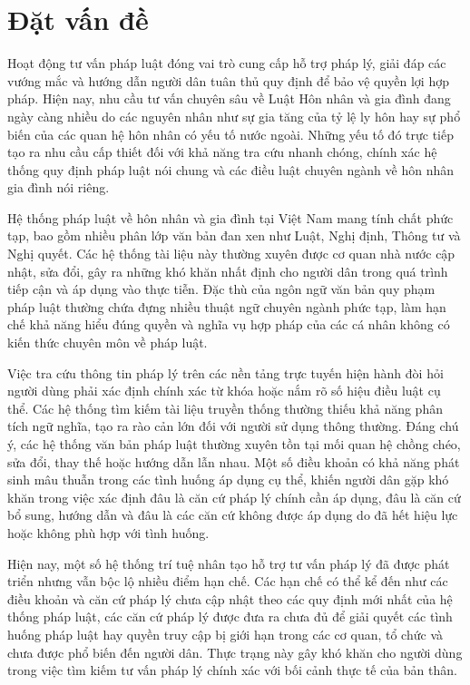 \documentclass[../DoAn.tex]{subfiles}
\begin{document}
\section{Đặt vấn đề}
\label{section:1.1}

Hoạt động tư vấn pháp luật đóng vai trò cung cấp hỗ trợ pháp lý, giải đáp các vướng mắc và hướng dẫn người dân tuân thủ quy định để bảo vệ quyền lợi hợp pháp. Hiện nay, nhu cầu tư vấn chuyên sâu về Luật Hôn nhân và gia đình đang ngày càng nhiều do các nguyên nhân như sự gia tăng của tỷ lệ ly hôn hay sự phổ biến của các quan hệ hôn nhân có yếu tố nước ngoài. Những yếu tố đó trực tiếp tạo ra nhu cầu cấp thiết đối với khả năng tra cứu nhanh chóng, chính xác hệ thống quy định pháp luật nói chung và các điều luật chuyên ngành về hôn nhân gia đình nói riêng.

Hệ thống pháp luật về hôn nhân và gia đình tại Việt Nam mang tính chất phức tạp, bao gồm nhiều phân lớp văn bản đan xen như Luật, Nghị định, Thông tư và Nghị quyết. Các hệ thống tài liệu này thường xuyên được cơ quan nhà nước cập nhật, sửa đổi, gây ra những khó khăn nhất định cho người dân trong quá trình tiếp cận và áp dụng vào thực tiễn. Đặc thù của ngôn ngữ văn bản quy phạm pháp luật thường chứa đựng nhiều thuật ngữ chuyên ngành phức tạp, làm hạn chế khả năng hiểu đúng quyền và nghĩa vụ hợp pháp của các cá nhân không có kiến thức chuyên môn về pháp luật. 

Việc tra cứu thông tin pháp lý trên các nền tảng trực tuyến hiện hành đòi hỏi người dùng phải xác định chính xác từ khóa hoặc nắm rõ số hiệu điều luật cụ thể. Các hệ thống tìm kiếm tài liệu truyền thống thường thiếu khả năng phân tích ngữ nghĩa, tạo ra rào cản lớn đối với người sử dụng thông thường. Đáng chú ý, các hệ thống văn bản pháp luật thường xuyên tồn tại mối quan hệ chồng chéo, sửa đổi, thay thế hoặc hướng dẫn lẫn nhau. Một số điều khoản có khả năng phát sinh mâu thuẫn trong các tình huống áp dụng cụ thể, khiến người dân gặp khó khăn trong việc xác định đâu là căn cứ pháp lý chính cần áp dụng, đâu là căn cứ bổ sung, hướng dẫn và đâu là các căn cứ không được áp dụng do đã hết hiệu lực hoặc không phù hợp với tình huống.

Hiện nay, một số hệ thống trí tuệ nhân tạo hỗ trợ tư vấn pháp lý đã được phát triển nhưng vẫn bộc lộ nhiều điểm hạn chế. Các hạn chế có thể kể đến như các điều khoản và căn cứ pháp lý chưa cập nhật theo các quy định mới nhất của hệ thống pháp luật, các căn cứ pháp lý được đưa ra chưa đủ để giải quyết các tình huống pháp luật hay quyền truy cập bị giới hạn trong các cơ quan, tổ chức và chưa được phổ biến đến người dân. Thực trạng này gây khó khăn cho người dùng trong việc tìm kiếm tư vấn pháp lý chính xác với bối cảnh thực tế của bản thân.
\end{document}
